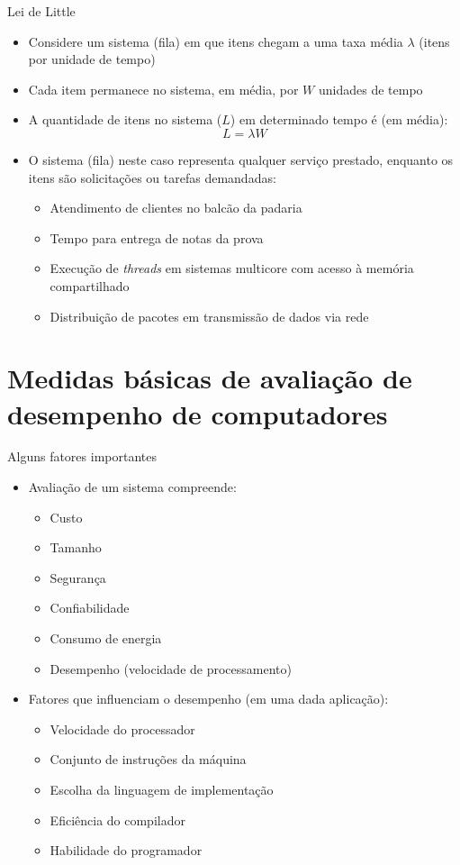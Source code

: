 \begin{slide}{Lei de Little}
	\begin{itemize}
		\item Considere um sistema (fila) em que itens chegam a uma taxa média $\lambda$ (itens por unidade de tempo)
		\item Cada item permanece no sistema, em média, por $W$ unidades de tempo
		\item A quantidade de itens no sistema ($L$) em determinado tempo é (em média):
			\begin{equation*}
				L = \lambda W
			\end{equation*}
		\item O sistema (fila) neste caso representa qualquer serviço prestado, enquanto os itens são solicitações ou tarefas demandadas:
			\begin{itemize}
				\item Atendimento de clientes no balcão da padaria
				\item Tempo para entrega de notas da prova
				\item Execução de \emph{threads} em sistemas multicore com acesso à memória compartilhado
				\item Distribuição de pacotes em transmissão de dados via rede
			\end{itemize}
	\end{itemize}
\end{slide}

\section[slide=true]{Medidas básicas de avaliação de desempenho de computadores}
\begin{slide}{Alguns fatores importantes}
\begin{itemize}
	\item Avaliação de um sistema compreende:
		\begin{itemize}
			\item Custo
			\item Tamanho
			\item Segurança
			\item Confiabilidade
			\item Consumo de energia
			\item Desempenho (velocidade de processamento)
		\end{itemize}\pause
	\item Fatores que influenciam o desempenho (em uma dada aplicação):
		\begin{itemize}
			\item Velocidade do processador
			\item Conjunto de instruções da máquina
			\item Escolha da linguagem de implementação
			\item Eficiência do compilador
			\item Habilidade do programador
		\end{itemize}
\end{itemize}
\end{slide}

